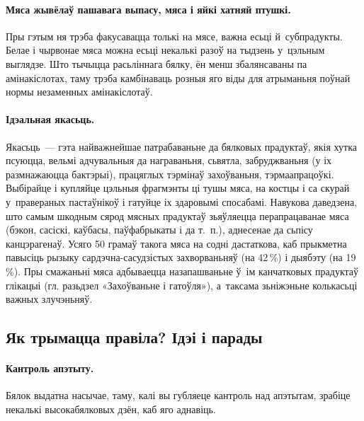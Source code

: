 
\paragraph{Мяса жывёлаў пашавага выпасу, мяса і яйкі хатняй птушкі.}
Пры гэтым ня трэба факусавацца толькі на мясе, важна есьці й~субпрадукты. Белае і чырвонае мяса можна есьці некалькі разоў на тыдзень у~цэльным выглядзе. Што тычыцца расьліннага бялку, ён менш збалянсаваны па амінакіслотах, таму трэба камбінаваць розныя яго віды для атрыманьня поўнай нормы незаменных амінакіслотаў.

\paragraph{Ідэальная якасьць.}
Якасьць~--- гэта найважнейшае патрабаваньне да бялковых прадуктаў, якія хутка псуюцца, вельмі адчувальныя да награваньня, сьвятла, забруджваньня (у іх размнажаюцца бактэрыі), працяглых тэрмінаў захоўваньня, тэрмаапрацоўкі. Выбірайце і купляйце цэльныя фрагмэнты ці тушы мяса, на костцы і са скурай у~правераных пастаўнікоў і гатуйце іх здаровымі спосабамі. Навукова даведзена, што самым шкодным сярод мясных прадуктаў зьяўляецца перапрацаванае мяса (бэкон, сасіскі, каўбасы, паўфабрыкаты і да т.~п.), аднесенае да сьпісу канцэрагенаў. Усяго 50 грамаў такога мяса на содні дастаткова, каб прыкметна павысіць рызыку сардэчна-сасудзістых захворваньняў (на 42\,\%) і дыябэту (на 19\,\%). Пры смажаньні мяса адбываецца назапашваньне ў~ім канчатковых прадуктаў глікацыі (гл. разьдзел «Захоўваньне і гатоўля»), а~таксама зьніжэньне колькасьці важных злучэньняў.

\subsection{Як трымацца правіла? Ідэі і парады}

\paragraph{Кантроль апэтыту.}
Бялок выдатна насычае, таму, калі вы губляеце кантроль над апэтытам, зрабіце некалькі высокабялковых дзён, каб яго аднавіць.

